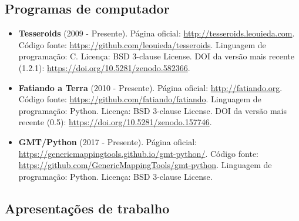 \documentclass[12pt,a4paper,oneside,titlepage,onecolumn]{article}
\begin{document}
\subsection{Programas de computador}

\begin{itemize}
    \item \textbf{Tesseroids} (2009 - Presente).
        Página oficial: \url{http://tesseroids.leouieda.com}.
        Código fonte: \url{https://github.com/leouieda/tesseroids}.
        Linguagem de programação: C.
        Licença: BSD 3-clause License.
        DOI da versão mais recente (1.2.1):
        \url{https://doi.org/10.5281/zenodo.582366}.
    \item \textbf{Fatiando a Terra} (2010 - Presente).
        Página oficial: \url{http://fatiando.org}.
        Código fonte: \url{https://github.com/fatiando/fatiando}.
        Linguagem de programação: Python.
        Licença: BSD 3-clause License.
        DOI da versão mais recente (0.5):
        \url{https://doi.org/10.5281/zenodo.157746}.
    \item \textbf{GMT/Python} (2017 - Presente).
        Página oficial: \url{https://genericmappingtools.github.io/gmt-python/}.
        Código fonte: \url{https://github.com/GenericMappingTools/gmt-python}.
        Linguagem de programação: Python.
        Licença: BSD 3-clause License.
\end{itemize}

\subsection{Apresentações de trabalho}
\end{document}
